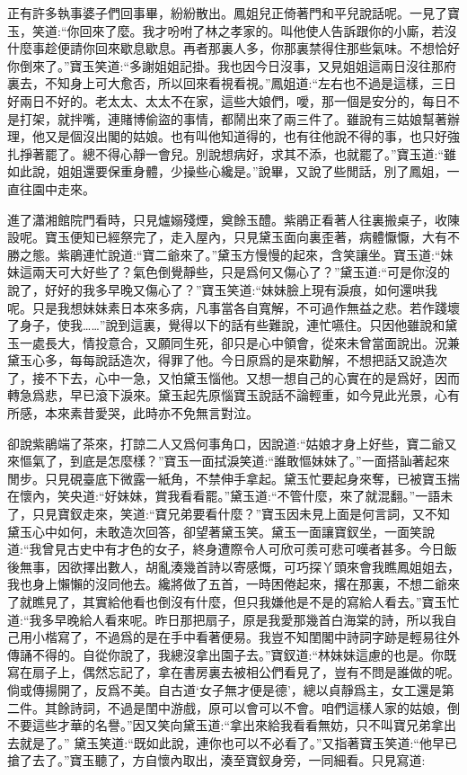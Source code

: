 \begin{parag}
    正有許多執事婆子們回事畢，紛紛散出。鳳姐兒正倚著門和平兒說話呢。一見了寶玉，笑道:“你回來了麼。我才吩咐了林之孝家的。叫他使人告訴跟你的小廝，若沒什麼事趁便請你回來歇息歇息。再者那裏人多，你那裏禁得住那些氣味。不想恰好你倒來了。”寶玉笑道:“多謝姐姐記掛。我也因今日沒事，又見姐姐這兩日沒往那府裏去，不知身上可大愈否，所以回來看視看視。”鳳姐道:“左右也不過是這樣，三日好兩日不好的。老太太、太太不在家，這些大娘們，噯，那一個是安分的，每日不是打架，就拌嘴，連賭博偷盜的事情，都鬧出來了兩三件了。雖說有三姑娘幫著辦理，他又是個沒出閣的姑娘。也有叫他知道得的，也有往他說不得的事，也只好強扎掙著罷了。總不得心靜一會兒。別說想病好，求其不添，也就罷了。”寶玉道:“雖如此說，姐姐還要保重身體，少操些心纔是。”說畢，又說了些閒話，別了鳳姐，一直往園中走來。
\end{parag}


\begin{parag}
    進了瀟湘館院門看時，只見爐嫋殘煙，奠餘玉醴。紫鵑正看著人往裏搬桌子，收陳設呢。寶玉便知已經祭完了，走入屋內，只見黛玉面向裏歪著，病體懨懨，大有不勝之態。紫鵑連忙說道:“寶二爺來了。”黛玉方慢慢的起來，含笑讓坐。寶玉道:“妹妹這兩天可大好些了？氣色倒覺靜些，只是爲何又傷心了？”黛玉道:“可是你沒的說了，好好的我多早晚又傷心了？”寶玉笑道:“妹妹臉上現有淚痕，如何還哄我呢。只是我想妹妹素日本來多病，凡事當各自寬解，不可過作無益之悲。若作踐壞了身子，使我……”說到這裏，覺得以下的話有些難說，連忙嚥住。只因他雖說和黛玉一處長大，情投意合，又願同生死，卻只是心中領會，從來未曾當面說出。況兼黛玉心多，每每說話造次，得罪了他。今日原爲的是來勸解，不想把話又說造次了，接不下去，心中一急，又怕黛玉惱他。又想一想自己的心實在的是爲好，因而轉急爲悲，早已滾下淚來。黛玉起先原惱寶玉說話不論輕重，如今見此光景，心有所感，本來素昔愛哭，此時亦不免無言對泣。
\end{parag}


\begin{parag}
    卻說紫鵑端了茶來，打諒二人又爲何事角口，因說道:“姑娘才身上好些，寶二爺又來慪氣了，到底是怎麼樣？”寶玉一面拭淚笑道:“誰敢慪妹妹了。”一面搭訕著起來閒步。只見硯臺底下微露一紙角，不禁伸手拿起。黛玉忙要起身來奪，已被寶玉揣在懷內，笑央道:“好妹妹，賞我看看罷。”黛玉道:“不管什麼，來了就混翻。”一語未了，只見寶釵走來，笑道:“寶兄弟要看什麼？”寶玉因未見上面是何言詞，又不知黛玉心中如何，未敢造次回答，卻望著黛玉笑。黛玉一面讓寶釵坐，一面笑說道:“我曾見古史中有才色的女子，終身遭際令人可欣可羨可悲可嘆者甚多。今日飯後無事，因欲擇出數人，胡亂湊幾首詩以寄感慨，可巧探丫頭來會我瞧鳳姐姐去，我也身上懶懶的沒同他去。纔將做了五首，一時困倦起來，撂在那裏，不想二爺來了就瞧見了，其實給他看也倒沒有什麼，但只我嫌他是不是的寫給人看去。”寶玉忙道:“我多早晚給人看來呢。昨日那把扇子，原是我愛那幾首白海棠的詩，所以我自己用小楷寫了，不過爲的是在手中看著便易。我豈不知閨閣中詩詞字跡是輕易往外傳誦不得的。自從你說了，我總沒拿出園子去。”寶釵道:“林妹妹這慮的也是。你既寫在扇子上，偶然忘記了，拿在書房裏去被相公們看見了，豈有不問是誰做的呢。倘或傳揚開了，反爲不美。自古道‘女子無才便是德’，總以貞靜爲主，女工還是第二件。其餘詩詞，不過是閨中游戲，原可以會可以不會。咱們這樣人家的姑娘，倒不要這些才華的名譽。”因又笑向黛玉道:“拿出來給我看看無妨，只不叫寶兄弟拿出去就是了。” 黛玉笑道:“既如此說，連你也可以不必看了。”又指著寶玉笑道:“他早已搶了去了。”寶玉聽了，方自懷內取出，湊至寶釵身旁，一同細看。只見寫道:
\end{parag}


